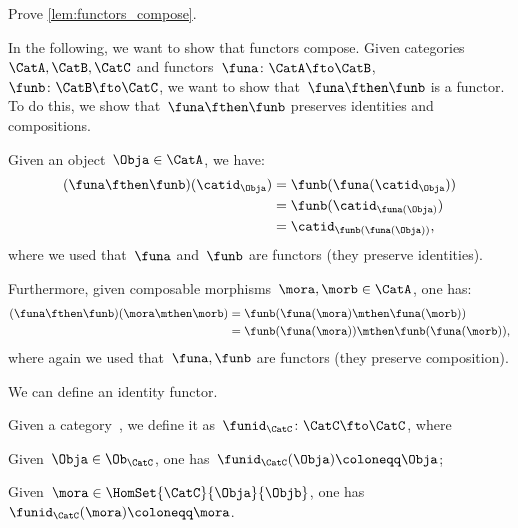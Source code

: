 \begin{exercise}
    Prove \cref{lem:functors_compose}.
\end{exercise}
\begin{solution}
    In the following, we want to show that functors compose.
    Given categories~$\CatA,\CatB,\CatC$ and functors~$\funa\colon \CatA\fto \CatB$,~$\funb \colon \CatB\fto \CatC$, we want to show that~$\funa\fthen\funb$ is a functor.
    To do this, we show that~$\funa\fthen\funb$ preserves identities and compositions.
    \begin{compactitem}
        \item Given an object~$\Obja\in \CatA$, we have:
        \begin{equation*}
            \begin{aligned}
            (\funa\fthen\funb)(\catid_\Obja)
                &=\funb(\funa(\catid_\Obja))\\
                &=\funb(\catid_{\funa(\Obja)})\\
                &=\catid_{\funb(\funa(\Obja))},
            \end{aligned}
        \end{equation*}
        where we used that~$\funa$ and~$\funb$ are functors (they preserve identities).
        \item Furthermore, given composable morphisms~$\mora,\morb\in \CatA$, one has:
        \begin{equation*}
            \begin{aligned}
            (\funa\fthen\funb)(\mora\mthen\morb)
                &=\funb(\funa(\mora)\mthen \funa(\morb))\\
                &=\funb(\funa(\mora))\mthen \funb(\funa(\morb)),
            \end{aligned}
        \end{equation*}
        where again we used that~$\funa,\funb$ are functors (they preserve composition).
    \end{compactitem}
\end{solution}


We can define an identity functor.

\begin{ctdefinition}
    \label{def:identity_functor}
    Given a category~\CatC, we define it as~$\funid_\CatC\colon \CatC \fto \CatC$, where
    \begin{compactitem}
        \item Given~$\Obja\in \Ob_\CatC$, one has~$\funid_\CatC(\Obja)\coloneqq \Obja$;
        \item Given~$\mora \in \HomSet{\CatC}{\Obja}{\Objb}$, one has~$\funid_\CatC(\mora)\coloneqq \mora$.
    \end{compactitem}
\end{ctdefinition}

